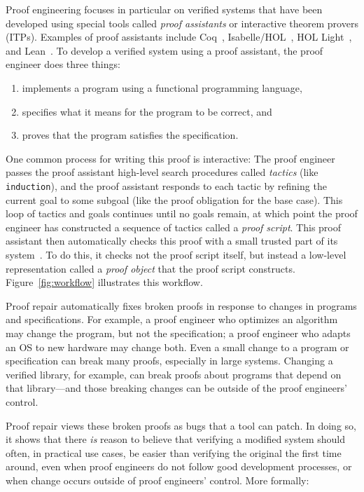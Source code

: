 Proof engineering focuses in particular on verified systems that have been
developed using special tools called \textit{proof assistants} or interactive theorem provers (ITPs).
Examples of proof assistants include Coq~\cite{coq}, Isabelle/HOL~\cite{isabelle}, 
HOL Light~\cite{hollight}, and Lean~\cite{lean}.
To develop a verified system using a proof assistant, the proof engineer does three things:

\begin{enumerate}
\item implements a program using a functional programming language,
\item specifies what it means for the program to be correct, and
\item proves that the program satisfies the specification.
\end{enumerate}
One common process for writing this proof is interactive: The proof engineer passes the proof assistant high-level
search procedures called \textit{tactics} (like \lstinline{induction}), and the proof assistant responds to each tactic
by refining the current goal to some subgoal (like the proof obligation for the base case). This loop of tactics and goals 
continues until no goals remain, at which point the proof engineer has constructed a sequence of tactics called a \textit{proof script}.
This proof assistant then automatically checks this proof with a small trusted part of its system~\cite{Barendregt2002,Barendregt2351}.
To do this, it checks not the proof script itself, but instead a low-level representation called a \textit{proof object} 
that the proof script constructs.
Figure~\ref{fig:workflow} illustrates this workflow.

Proof repair automatically fixes broken proofs in response to changes in programs and specifications.
For example, a proof engineer who optimizes an algorithm may change the program, but not the specification; a proof engineer who adapts an OS to new hardware may change both. Even a small change to a program or specification can break many proofs, especially in large systems.
Changing a verified library, for example, can break proofs about programs that depend on that library---and those breaking changes
can be outside of the proof engineers' control.

Proof repair views these broken proofs as bugs that a tool can patch.
In doing so, it shows that there \textit{is} reason to believe that verifying a modified system should often, in practical use cases, be easier than verifying the original the first time around,
even when proof engineers do not follow good development processes,
or when change occurs outside of proof engineers' control.
More formally:

